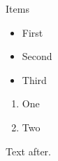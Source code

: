 \documentclass{beamer}
\begin{document}
\begin{frame}{Items}
\begin{itemize}
\item First
\item<2-> Second
\item<3-> Third
\end{itemize}
\end{frame}
\begin{frame}
\begin{enumerate}[<+->]
\item One
\item Two
\end{enumerate}
Text after.
\end{frame}
\end{document}

